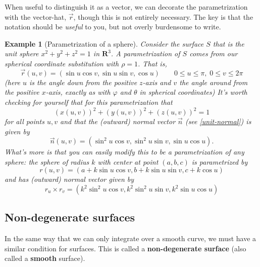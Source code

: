 \documentclass[12pt]{article}
\numberwithin{equation}{subsection}
\numberwithin{figure}{subsection}
\theoremstyle{note}
\newtheorem{example}[subsection]{Example}
\begin{document}
{When useful to distinguish it as a vector, we can decorate the parametrization with the vector-hat, $\vec{r}$, though this is not entirely necessary. The key is that the notation should be \textit{useful} to you, but not overly burdensome to write.

\begin{example}[Parametrization of a sphere] Consider the surface $S$ that is the unit sphere $x^2+y^2+z^2=1$ in $\mathbf{R}^3$. A parametrization of $S$ comes from our spherical coordinate substitution with $\rho=1$. That is, \begin{equation} \vec{r}(u,v)=(\sin u\cos v, \sin u\sin v, \cos u) \qquad 0\leq u\leq \pi, \; 0 \leq v \leq 2\pi\end{equation} (here $u$ is the angle down from the positive $z$-axis and $v$ the angle around from the positive $x$-axis, exactly as with $\varphi$ and $\theta$ in spherical coordinates)
It's worth checking for yourself that for this parametrization that  \[(x(u,v))^2+(y(u,v))^2+(z(u,v))^2=1\] for all points $u,v$ and that the (outward) normal vector $\vec{n}$ (see \eqref{unit-normal}) is given by \begin{equation} \vec{n}(u,v)=(\sin^2 u\cos v, \sin^2 u\sin v, \sin u\cos u).\end{equation} What's more is that you can easily modify this to be a parametrization of any sphere: the sphere of radius $k$ with center at point $(a,b,c)$ is parametrized by \begin{equation} r(u,v)=(a+k\sin u \cos v, b+k\sin u \sin v, c+k\cos u)\end{equation} and has (outward) normal vector given by \begin{equation} r_u\times r_v= (k^2\sin^2 u\cos v, k^2\sin^2 u\sin v, k^2\sin u\cos u)
\end{equation}
\end{example}

\subsection{Non-degenerate surfaces} In the same way that we can only integrate over a smooth curve, we must have a similar condition for surfaces. This is called a \textbf{non-degenerate surface} (also called a \textbf{smooth} surface).  

}
\end{document}
